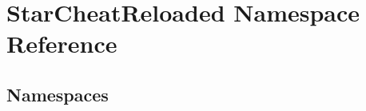 \hypertarget{namespace_star_cheat_reloaded}{}\section{Star\+Cheat\+Reloaded Namespace Reference}
\label{namespace_star_cheat_reloaded}
\subsection*{Namespaces}
\begin{DoxyCompactItemize}
\end{DoxyCompactItemize}
